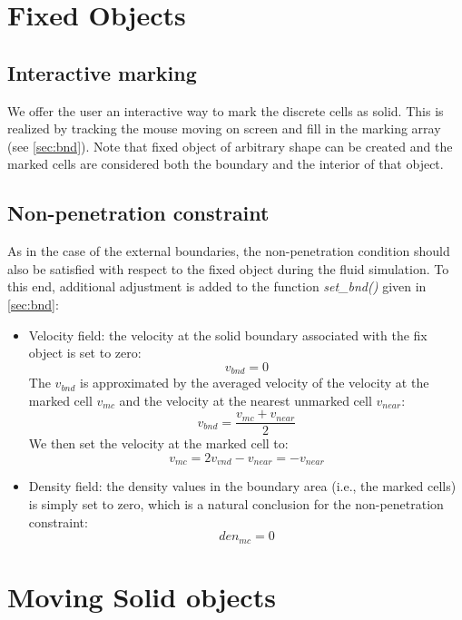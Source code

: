 \section{Fixed Objects}
\subsection{Interactive marking}
We offer the user an interactive way to mark the discrete cells as solid. This is realized by tracking the mouse moving on screen and fill in the marking array (see \autoref{sec:bnd}). Note that fixed object of arbitrary shape can be created and the marked cells are considered both the boundary and the interior of that object.
\subsection{Non-penetration constraint}
\label{sec:fixed bc}
As in the case of the external boundaries, the non-penetration condition should also be satisfied with respect to the fixed object during the fluid simulation.
To this end, additional adjustment is added to the function \emph{set\_bnd()} given in \autoref{sec:bnd}:
\begin{itemize}
    \item Velocity field: the velocity at the solid boundary associated with the fix object is set to zero:
    \begin{equation*}
        v_{bnd}=0
    \end{equation*}
    The $v_{bnd}$ is approximated by the averaged velocity of the velocity at the marked cell $v_{mc}$ and the velocity at the nearest unmarked cell $v_{near}$:
    \begin{equation*}
        v_{bnd}=\frac{v_{mc}+v_{near}}{2}
    \end{equation*}
    We then set the velocity at the marked cell to:
    \begin{equation*}
        v_{mc}=2v_{vnd}-v_{near}=-v_{near}
    \end{equation*}
    \item Density field: the density values in the boundary area (i.e., the marked cells) is simply set to zero, which is a natural conclusion for the non-penetration constraint:
    \begin{equation*}
        den_{mc}=0
    \end{equation*}
\end{itemize}

\section{Moving Solid objects}

